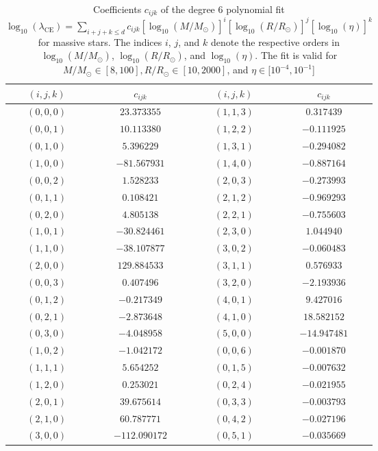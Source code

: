 \begin{table}
\centering
\caption{Coefficients $c_{ijk}$ of the degree 6 polynomial fit $\log_{10}(\lambda_{\mathrm{CE}})=\sum_{i+j+k\leq d}c_{ijk}\left[\log_{10}(M/M_\odot)\right]^i\left[\log_{10}(R/R_\odot)\right]^j\left[\log_{10}(\eta)\right]^k$ for massive stars. The indices $i$, $j$, and $k$ denote the respective orders in $\log_{10}(M/M_\odot)$, $\log_{10}(R/R_\odot)$, and $\log_{10}(\eta)$. The fit is valid for $M/M_\odot\in[8,100], R/R_\odot\in[10,2000]$, and $\eta\in[10^{-4},10^{-1}$]}
\label{tab:tab:lambda_ce_3d_coef_massive}
\begin{tabular}{cc@{\qquad}cc}
\hline
$(i,j,k)$ & $c_{ijk}$ & $(i,j,k)$ & $c_{ijk}$ \\
\hline
$(0,0,0)$ & $23.373355$ & $(1,1,3)$ & $0.317439$ \\
$(0,0,1)$ & $10.113380$ & $(1,2,2)$ & $-0.111925$ \\
$(0,1,0)$ & $5.396229$ & $(1,3,1)$ & $-0.294082$ \\
$(1,0,0)$ & $-81.567931$ & $(1,4,0)$ & $-0.887164$ \\
$(0,0,2)$ & $1.528233$ & $(2,0,3)$ & $-0.273993$ \\
$(0,1,1)$ & $0.108421$ & $(2,1,2)$ & $-0.969293$ \\
$(0,2,0)$ & $4.805138$ & $(2,2,1)$ & $-0.755603$ \\
$(1,0,1)$ & $-30.824461$ & $(2,3,0)$ & $1.044940$ \\
$(1,1,0)$ & $-38.107877$ & $(3,0,2)$ & $-0.060483$ \\
$(2,0,0)$ & $129.884533$ & $(3,1,1)$ & $0.576933$ \\
$(0,0,3)$ & $0.407496$ & $(3,2,0)$ & $-2.193936$ \\
$(0,1,2)$ & $-0.217349$ & $(4,0,1)$ & $9.427016$ \\
$(0,2,1)$ & $-2.873648$ & $(4,1,0)$ & $18.582152$ \\
$(0,3,0)$ & $-4.048958$ & $(5,0,0)$ & $-14.947481$ \\
$(1,0,2)$ & $-1.042172$ & $(0,0,6)$ & $-0.001870$ \\
$(1,1,1)$ & $5.654252$ & $(0,1,5)$ & $-0.007632$ \\
$(1,2,0)$ & $0.253021$ & $(0,2,4)$ & $-0.021955$ \\
$(2,0,1)$ & $39.675614$ & $(0,3,3)$ & $-0.003793$ \\
$(2,1,0)$ & $60.787771$ & $(0,4,2)$ & $-0.027196$ \\
$(3,0,0)$ & $-112.090172$ & $(0,5,1)$ & $-0.035669$ \\

\end{tabular}
\end{table}
